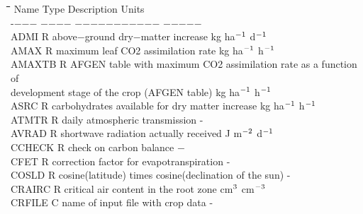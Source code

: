 \documentclass[11pt]{article}
\begin{document}
\begin{tabbing}
\hspace{1.27cm}\=\hspace{1.27cm}\=\hspace{1.27cm}\=\hspace{1.27cm}\=%
\hspace{1.27cm}\=\hspace{1.27cm}\=\hspace{1.27cm}\=\hspace{1.27cm}\=%
\hspace{1.27cm}\=\hspace{1.27cm}\=\kill
Name    \> \> Type   \> Description                                        \> \> \> \> \> \> \> Units\\
-$-$$-$$-$    \> \> $-$$-$$-$$-$   \> $-$$-$$-$$-$$-$$-$$-$$-$$-$$-$$-$                                        \> \> \> \> \> \> \> $-$$-$$-$$-$$-$ \\
ADMI    \> \> R   \> above$-$ground dry$-$matter increase                   \> \> \> \> \> \> \> kg ha$^{{\rm -1}}$ d$^{{\rm -1}}$\\
AMAX    \> \> R   \> maximum leaf CO2 assimilation rate                 \> \> \> \> \> \> \> kg ha$^{{\rm -1}}$ h$^{{\rm -1}}$\\
AMAXTB\> \> R\> AFGEN table with maximum CO2 assimilation rate as a function of\\
\>\> \> development stage of the crop (AFGEN table)\> \> \> \> \> \> \> kg ha$^{{\rm -1}}$ h$^{{\rm -1}}$\\
ASRC    \> \> R   \> carbohydrates available for dry matter increase    \> \> \> \> \> \> \> kg ha$^{{\rm -1}}$ h$^{{\rm -1}}$\\
ATMTR\> \> R\> daily atmospheric transmission\> \> \> \> \> \> \> -\\
AVRAD   \> \> R   \> shortwave radiation actually received              \> \> \> \> \> \> \> J m$^{{\rm -2}}$ d$^{{\rm -1}}$\\
CCHECK  \> \> R   \> check on carbon balance                            \> \> \> \> \> \> \> $-$\\
CFET\> \> R\> correction factor for evapotranspiration\> \> \> \> \> \> \> -\\
COSLD   \> \> R   \> cosine(latitude) times cosine(declination of the sun)             \> \> \> \> \> \> \> -\\
CRAIRC\> \> R\> critical air content in the root zone\> \> \> \> \> \> \> cm$^{{\rm 3}}$ cm$^{{\rm -3}}$\\
CRFILE\> \> C\> name of input file with crop data\> \> \> \> \> \> \> - \\
$$
\end{tabbing}
\end{document}
